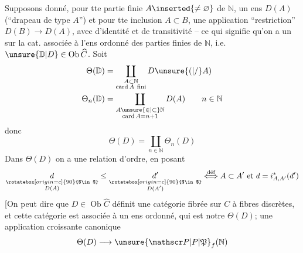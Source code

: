 Supposons donné, pour tte partie finie $A\inserted{\ne\varnothing}$ de $\mathbb N$, un ens $D(A)$ (``drapeau de type $A$'') et pour tte inclusion $A\subset B$, une application ``restriction'' $D(B)\longrightarrow D(A)$, avec   d'identité et de transitivité --
ce qui signifie qu'on a un   sur la cat.  associée à l'ens ordonné des parties finies de $\mathbb N$, i.e. $\unsure{\mathbb D|D}\in\operatorname{Ob}\widehat C$.
 Soit
\[
\begin{aligned}
\Theta(\mathbb D)&=\coprod_{\substack{A\subset\mathbb N\\\operatorname{card}A\ \text{fini}}}D\unsure{(|/}A)\\
\Theta_n(\mathbb D)&=\coprod_{\substack{A\unsure{\in|\subset}\mathbb N\\\operatorname{card}A=n+1}}D(A)\qquad n\in\mathbb N
\end{aligned}
\]
donc
\[
\Theta(D)=\coprod_{n\in\mathbb N}\Theta_n(D)
\]
Dans $\Theta(D)$ on a une relation d'ordre, en posant
\[
\underset{\substack{\rotatebox[origin=c]{90}{$\in$}\\D(A)}}{d}\leq
\underset{\substack{\rotatebox[origin=c]{90}{$\in$}\\D(A')}}{d'}
\overset{\text{déf}}{\Longleftrightarrow}
 A\subset A'\text{ et }d=i_{A,A'}^*(d')
\]
[On peut dire que $D\in\operatorname{Ob}\widehat C$ définit une catégorie fibrée sur $C$ à fibres discrètes, et cette catégorie est associée à un ens ordonné, qui est notre $\Theta(D)$;  une application croissante canonique
\[
\Theta(D)\longrightarrow\unsure{\mathscr P|P|\mathfrak P}_{f}(\mathbb N)
\]
